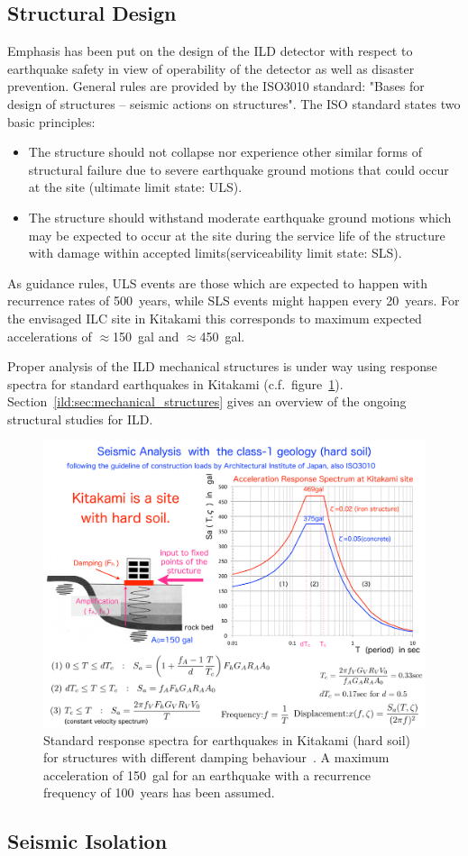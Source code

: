 \subsection{Structural Design}

Emphasis has been put on the design of the ILD detector with respect to earthquake safety in view of operability of the detector as well as disaster prevention. General rules are provided by the ISO3010 standard: "Bases for design of structures -- seismic actions on structures". The ISO standard states two basic principles:
\begin{itemize}
\item The structure should not collapse nor experience other similar forms of structural failure due to severe earthquake ground motions that could occur at the site (ultimate limit state: ULS).
\item The structure should withstand moderate earthquake ground motions which may be expected to occur at the site during the service life of the structure with damage within accepted limits(serviceability limit state: SLS).
\end{itemize}
As guidance rules, ULS events are those which are expected to happen with recurrence rates of 500~years, while SLS events might happen every 20~years. For the envisaged ILC site in Kitakami this corresponds to maximum expected accelerations of $\approx$150~gal and $\approx$450~gal. 

Proper analysis of the ILD mechanical structures is under way using response spectra for standard earthquakes in Kitakami (c.f.~figure~\ref{ild:fig:integration:earthquake_spectra}). Section~\ref{ild:sec:mechanical_structures} gives an overview of the ongoing structural studies for ILD.

\begin{figure}[t!]

\includegraphics[width=0.8\hsize]{Integration/fig/earthquake_spectra.pdf}

\caption{\label{ild:fig:integration:earthquake_spectra}Standard response spectra for earthquakes in Kitakami (hard soil) for structures with different damping behaviour~\cite{ild:bib:earthquake}. A maximum acceleration of 150~gal for an earthquake with a recurrence frequency of 100~years has been assumed.}
\end{figure}

\subsection{Seismic Isolation}


